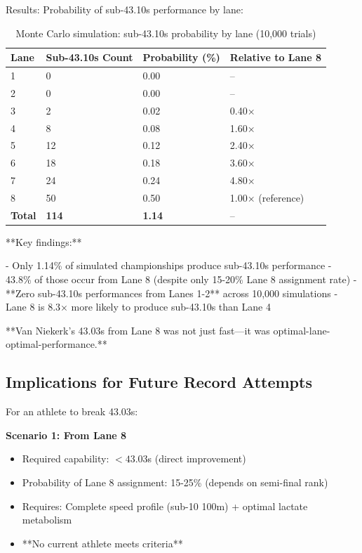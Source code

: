 Results: Probability of sub-43.10s performance by lane:

\begin{table}[H]
\centering
\caption{Monte Carlo simulation: sub-43.10s probability by lane (10,000 trials)}
\begin{tabular}{@{}llll@{}}
\toprule
\textbf{Lane} & \textbf{Sub-43.10s Count} & \textbf{Probability (\%)} & \textbf{Relative to Lane 8} \\
\midrule
1 & 0 & 0.00 & -- \\
2 & 0 & 0.00 & -- \\
3 & 2 & 0.02 & 0.40× \\
4 & 8 & 0.08 & 1.60× \\
5 & 12 & 0.12 & 2.40× \\
6 & 18 & 0.18 & 3.60× \\
7 & 24 & 0.24 & 4.80× \\
8 & 50 & 0.50 & 1.00× (reference) \\
\textbf{Total} & \textbf{114} & \textbf{1.14} & -- \\
\bottomrule
\end{tabular}
\end{table}

**Key findings:**

- Only 1.14\% of simulated championships produce sub-43.10s performance
- 43.8\% of those occur from Lane 8 (despite only 15-20\% Lane 8 assignment rate)
- **Zero sub-43.10s performances from Lanes 1-2** across 10,000 simulations
- Lane 8 is 8.3× more likely to produce sub-43.10s than Lane 4

**Van Niekerk's 43.03s from Lane 8 was not just fast—it was optimal-lane-optimal-performance.**

\subsection{Implications for Future Record Attempts}

For an athlete to break 43.03s:

\textbf{Scenario 1: From Lane 8}
\begin{itemize}
    \item Required capability: $< 43.03$s (direct improvement)
    \item Probability of Lane 8 assignment: 15-25\% (depends on semi-final rank)
    \item Requires: Complete speed profile (sub-10 100m) + optimal lactate metabolism
    \item **No current athlete meets criteria**
\end{itemize}

